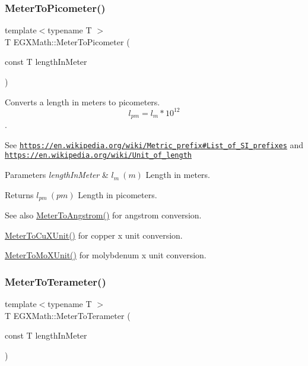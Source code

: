 \subsubsection{\texorpdfstring{Meter\+To\+Picometer()}{MeterToPicometer()}}
{\footnotesize\ttfamily template$<$typename T $>$ \\
T E\+G\+X\+Math\+::\+Meter\+To\+Picometer (\begin{DoxyParamCaption}\item[{const T}]{length\+In\+Meter }\end{DoxyParamCaption})}



Converts a length in meters to picometers. \[ l_{pm}=l_{m} * 10^{12} \]. 

See \href{https://en.wikipedia.org/wiki/Metric_prefix#List_of_SI_prefixes}{\tt https\+://en.\+wikipedia.\+org/wiki/\+Metric\+\_\+prefix\#\+List\+\_\+of\+\_\+\+S\+I\+\_\+prefixes} and \href{https://en.wikipedia.org/wiki/Unit_of_length}{\tt https\+://en.\+wikipedia.\+org/wiki/\+Unit\+\_\+of\+\_\+length} 
\begin{DoxyParams}{Parameters}
{\em length\+In\+Meter} & $ l_{m}\ (m)$ Length in meters. \\
\hline
\end{DoxyParams}
\begin{DoxyReturn}{Returns}
$ l_{pm}\ (pm)$ Length in picometers. 
\end{DoxyReturn}
\begin{DoxySeeAlso}{See also}
\mbox{\hyperlink{group___e_g_x_math-_conversions-_length_conversions-_s_i-_meter-_non-_s_i_ga9e6d5040f58d167bd7a4b6cebb5527ee}{Meter\+To\+Angstrom()}} for angstrom conversion. 

\mbox{\hyperlink{group___e_g_x_math-_conversions-_length_conversions-_s_i-_meter-_non-_s_i_ga67cec26b74704753fc51a8f4db27a4b4}{Meter\+To\+Cu\+X\+Unit()}} for copper x unit conversion. 

\mbox{\hyperlink{group___e_g_x_math-_conversions-_length_conversions-_s_i-_meter-_non-_s_i_gae0351200a3d90c4efe741c6057b2fd4b}{Meter\+To\+Mo\+X\+Unit()}} for molybdenum x unit conversion. 
\end{DoxySeeAlso}
\mbox{\label{group___e_g_x_math-_conversions-_length_conversions-_s_i-_meter-_s_i_gac4c21d00b7d8e8fc1c9e354f77bf94b2}} 
\subsubsection{\texorpdfstring{Meter\+To\+Terameter()}{MeterToTerameter()}}
{\footnotesize\ttfamily template$<$typename T $>$ \\
T E\+G\+X\+Math\+::\+Meter\+To\+Terameter (\begin{DoxyParamCaption}\item[{const T}]{length\+In\+Meter }\end{DoxyParamCaption})}



